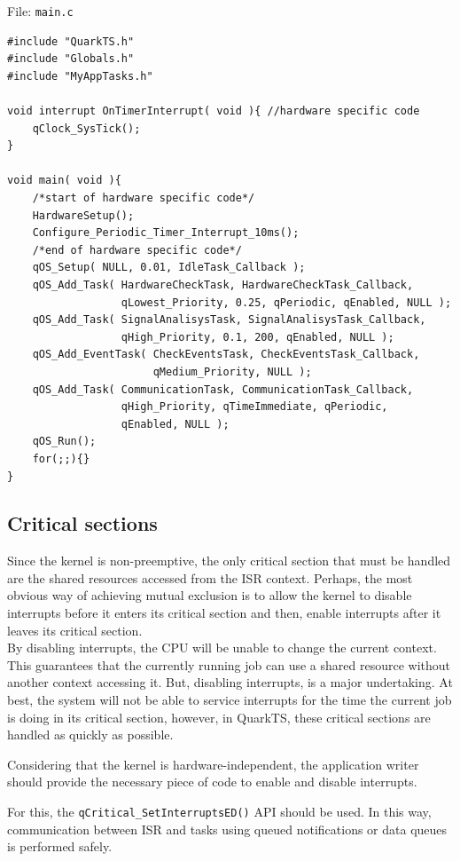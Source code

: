 \documentclass{article}
\begin{document}
File: \lstinline{main.c}
\begin{lstlisting}[style=CStyle]
#include "QuarkTS.h"
#include "Globals.h"
#include "MyAppTasks.h"

void interrupt OnTimerInterrupt( void ){ //hardware specific code
    qClock_SysTick();
}

void main( void ){
    /*start of hardware specific code*/
    HardwareSetup();
    Configure_Periodic_Timer_Interrupt_10ms(); 
    /*end of hardware specific code*/
    qOS_Setup( NULL, 0.01, IdleTask_Callback ); 
    qOS_Add_Task( HardwareCheckTask, HardwareCheckTask_Callback,
                  qLowest_Priority, 0.25, qPeriodic, qEnabled, NULL );
    qOS_Add_Task( SignalAnalisysTask, SignalAnalisysTask_Callback, 
                  qHigh_Priority, 0.1, 200, qEnabled, NULL );
    qOS_Add_EventTask( CheckEventsTask, CheckEventsTask_Callback, 
                       qMedium_Priority, NULL ); 
    qOS_Add_Task( CommunicationTask, CommunicationTask_Callback, 
                  qHigh_Priority, qTimeImmediate, qPeriodic, 
                  qEnabled, NULL );
    qOS_Run();
    for(;;){}
}
\end{lstlisting}


\subsection{Critical sections}
Since the kernel is non-preemptive, the only critical section that must be handled are the shared resources accessed from the ISR context. Perhaps, the most obvious way of achieving mutual exclusion is to allow the kernel to disable interrupts before it enters its critical section and then, enable interrupts after it leaves its critical section. \\

By disabling interrupts, the CPU will be unable to change the current context. This guarantees that the currently running job can use a shared resource without another context accessing it. But, disabling interrupts, is a major undertaking. At best, the system will not be able to service interrupts for the time the current job is doing in its critical section, however, in QuarkTS, these critical sections are handled as quickly as possible.  

Considering that the kernel is hardware-independent, the application writer should provide the necessary piece of code to enable and disable interrupts.

For this, the \lstinline{qCritical_SetInterruptsED()}  API should be used. In this way, communication between ISR and tasks using queued notifications or data queues is performed safely. \\
\end{document}
